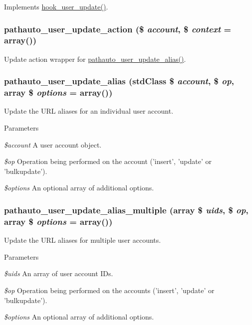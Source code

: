 \label{pathauto_8module_ac2569a0defd03ecce4977acb75c6db3e}
Implements \hyperlink{group__hooks_gab71262402336071ef7c3d08f4c36e887}{hook\_\-user\_\-update()}. \hypertarget{pathauto_8module_a2fd42a248c056cf7d45629b64ed3ffb9}{
\subsubsection[{pathauto\_\-user\_\-update\_\-action}]{\setlength{\rightskip}{0pt plus 5cm}pathauto\_\-user\_\-update\_\-action (\$ {\em account}, \/  \$ {\em context} = {\ttfamily array()})}}
\label{pathauto_8module_a2fd42a248c056cf7d45629b64ed3ffb9}
Update action wrapper for \hyperlink{pathauto_8module_a201f74ecc823bdf66f3a58bf41dfa532}{pathauto\_\-user\_\-update\_\-alias()}. \hypertarget{pathauto_8module_a201f74ecc823bdf66f3a58bf41dfa532}{
\subsubsection[{pathauto\_\-user\_\-update\_\-alias}]{\setlength{\rightskip}{0pt plus 5cm}pathauto\_\-user\_\-update\_\-alias (stdClass \$ {\em account}, \/  \$ {\em op}, \/  array \$ {\em options} = {\ttfamily array()})}}
\label{pathauto_8module_a201f74ecc823bdf66f3a58bf41dfa532}
Update the URL aliases for an individual user account.


\begin{DoxyParams}{Parameters}
\item[{\em \$account}]A user account object. \item[{\em \$op}]Operation being performed on the account ('insert', 'update' or 'bulkupdate'). \item[{\em \$options}]An optional array of additional options. \end{DoxyParams}
\hypertarget{pathauto_8module_a764a68ac848f7a0699787a3c76cd1046}{
\subsubsection[{pathauto\_\-user\_\-update\_\-alias\_\-multiple}]{\setlength{\rightskip}{0pt plus 5cm}pathauto\_\-user\_\-update\_\-alias\_\-multiple (array \$ {\em uids}, \/  \$ {\em op}, \/  array \$ {\em options} = {\ttfamily array()})}}
\label{pathauto_8module_a764a68ac848f7a0699787a3c76cd1046}
Update the URL aliases for multiple user accounts.


\begin{DoxyParams}{Parameters}
\item[{\em \$uids}]An array of user account IDs. \item[{\em \$op}]Operation being performed on the accounts ('insert', 'update' or 'bulkupdate'). \item[{\em \$options}]An optional array of additional options. \end{DoxyParams}
